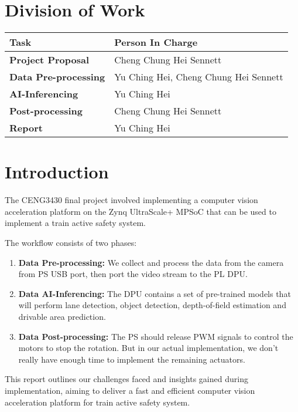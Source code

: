 \documentclass[12pt, a4paper]{article}
\begin{document}
\setcounter{page}{2}

\tableofcontents

\section*{Division of Work}
\begin{tabularx}{\textwidth}{|l||X|}
    \hline
    \textbf{Task} & \textbf{Person In Charge} \\
    \hline\hline
    \textbf{Project Proposal} & Cheng Chung Hei Sennett \\
    \hline
    \textbf{Data Pre-processing} & Yu Ching Hei, Cheng Chung Hei Sennett \\
    \hline
    \textbf{AI-Inferencing} & Yu Ching Hei \\
    \hline
    \textbf{Post-processing} & Cheng Chung Hei Sennett \\
    \hline
    \textbf{Report} & Yu Ching Hei \\
    \hline
\end{tabularx}

\newpage
{}
\setcounter{page}{1}

\section{Introduction}

The CENG3430 final project involved implementing a computer vision acceleration platform on the Zynq UltraScale+ MPSoC \cite{zynq_ultrascale_swdev}
that can be used to implement a train active safety system.

\noindent The workflow consists of two phases:
\begin{enumerate}
    \item \textbf{Data Pre-processing:} We collect and process the data from the camera from PS USB port, then port the video stream to the PL DPU. 
    \item \textbf{Data AI-Inferencing:} The DPU contains a set of pre-trained models that will perform lane detection, object detection, depth-of-field estimation and drivable area prediction.
    \item \textbf{Data Post-processing:} The PS should release PWM signals to control the motors to stop the rotation. But in our actual implementation, we don't really have enough time to implement the remaining actuators. 
\end{enumerate}
This report outlines our challenges faced and insights gained during implementation, aiming to deliver a fast and efficient computer vision acceleration platform for train active safety system.
\end{document}
